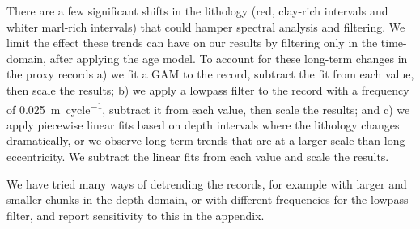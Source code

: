 \documentclass[draft]{agujournal2019}
\begin{document}
There are a few significant shifts in the lithology (red, clay-rich intervals and whiter marl-rich intervals) that could hamper spectral analysis and filtering.
We limit the effect these trends can have on our results by filtering only in the time-domain, after applying the age model.
To account for these long-term changes in the proxy records
a) we fit a \gls{GAM} to the record, subtract the fit from each value, then scale the results;
b) we apply a lowpass filter to the record with a frequency of \qty{0.025}{\metre\per cycle}, subtract it from each value, then scale the results;
and c) we apply piecewise linear fits based on depth intervals where the lithology changes dramatically, or we observe long-term trends that are at a larger scale than long eccentricity. We subtract the linear fits from each value and scale the results.

We have tried many ways of detrending the records, for example with larger and smaller chunks in the depth domain, or with different frequencies for the lowpass filter, and report sensitivity to this in the appendix.

\end{document}
